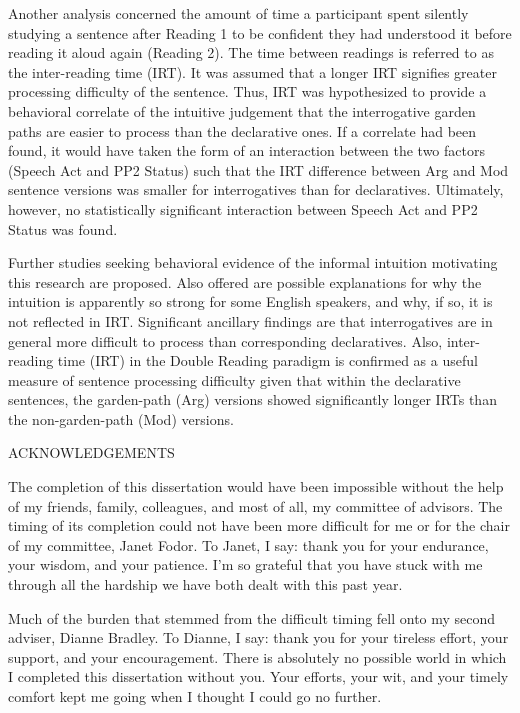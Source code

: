 \documentclass[11pt,oneside]{book}
\begin{document}
Another analysis concerned the amount of time a participant spent silently studying a sentence after Reading 1 to be confident they had understood it before reading it aloud again (Reading 2). The time between readings is referred to as the inter-reading time (IRT). It was assumed that a longer IRT signifies greater processing difficulty of the sentence. Thus, IRT was hypothesized to provide a behavioral correlate of the intuitive judgement that the interrogative garden paths are easier to process than the declarative ones. If a correlate had been found, it would have taken the form of an interaction between the two factors (Speech Act and PP2 Status) such that the IRT difference between Arg and Mod sentence versions was smaller for interrogatives than for declaratives.  Ultimately, however, no statistically significant interaction between Speech Act and PP2 Status was found. 

Further studies seeking behavioral evidence of the informal intuition motivating this research are proposed. Also offered are possible explanations for why the intuition is apparently so strong for some English speakers, and why, if so, it is not reflected in IRT. Significant ancillary findings are that interrogatives are in general more difficult to process than corresponding declaratives. Also, inter-reading time (IRT) in the Double Reading paradigm is confirmed as a useful measure of sentence processing difficulty given that within the declarative sentences, the garden-path (Arg) versions showed significantly longer IRTs than the non-garden-path (Mod) versions. 

\pagebreak

\centering 

ACKNOWLEDGEMENTS

\vspace{0.5in}

\raggedright

\setlength\parindent{24pt}\setlength{\parskip}{0.0pt plus 1.0pt}

The completion of this dissertation would have been impossible without the help of my friends, family, colleagues, and most of all, my committee of advisors. The timing of its completion could not have been more difficult for me or for the chair of my committee, Janet Fodor. To Janet, I say: thank you for your endurance, your wisdom, and your patience. I'm so grateful that you have stuck with me through all the hardship we have both dealt with this past year.

Much of the burden that stemmed from the difficult timing fell onto my second adviser, Dianne Bradley. To Dianne, I say: thank you for your tireless effort, your support, and your encouragement. There is absolutely no possible world in which I completed this dissertation without you. Your efforts, your wit, and your timely comfort kept me going when I thought I could go no further.
	
\end{document}
